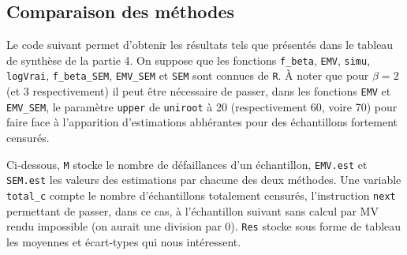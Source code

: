 \documentclass[a4paper]{report}
\begin{document}
\begin{appendix}
  \chapter{Comparaison des méthodes}
  \label{comp}
  Le code suivant permet d'obtenir les résultats tels que présentés dans le tableau de synthèse de la partie 4. On suppose que les fonctions \verb|f_beta|, \verb|EMV|, \verb|simu|, \verb|logVrai|, \verb|f_beta_SEM|, \verb|EMV_SEM| et \verb|SEM| sont connues de \verb|R|. À noter que pour $\beta=2$ (et 3 respectivement) il peut être nécessaire de passer, dans les fonctions \verb|EMV| et \verb|EMV_SEM|, le paramètre \verb|upper| de \verb|uniroot| à 20 (respectivement 60, voire 70) pour faire face à l'apparition d'estimations abhérantes pour des échantillons fortement censurés. 
  
 Ci-dessous, \verb|M| stocke le nombre de défaillances d'un échantillon, \verb|EMV.est| et \verb|SEM.est| les valeurs des estimations par chacune des deux méthodes. Une variable \verb|total_c| compte le nombre d'échantillons totalement censurés, l'instruction \verb|next| permettant de passer, dans ce cas, à l'échantillon suivant sans calcul par MV rendu impossible (on aurait une division par 0). \verb|Res| stocke sous forme de tableau les moyennes et écart-types qui nous intéressent. 
    
    
  \end{appendix}
\end{document}
